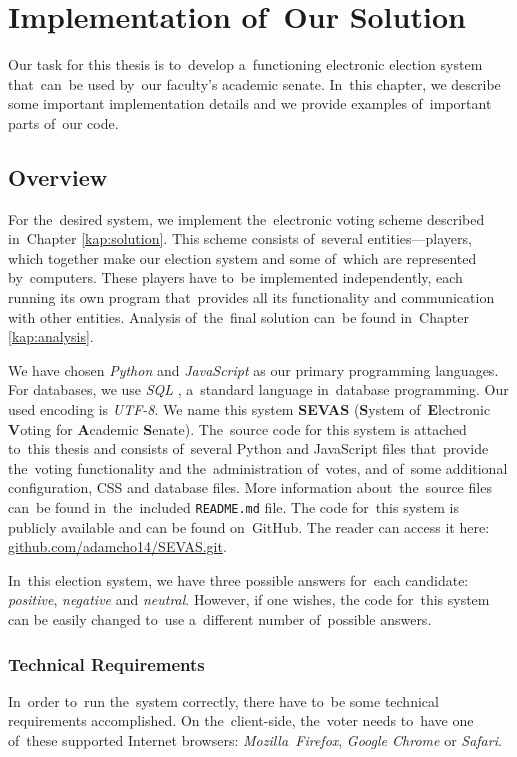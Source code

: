 \chapter{Implementation of~Our Solution}
\label{kap:implementation}
Our task for this thesis is to~develop a~functioning electronic election system that~can~be used by~our faculty's academic senate. In~this chapter, we describe some important implementation details and we provide examples of~important parts of~our code.

\section{Overview}
For the~desired system, we implement the~electronic voting scheme described in~Chapter \ref{kap:solution}. This scheme consists of~several entities—players, which together make our election system and some of~which are represented by~computers. These players have to~be implemented independently, each running its own program that~provides all its functionality and communication with other entities. Analysis of~the~final solution can~be found in~Chapter \ref{kap:analysis}.

We have chosen \emph{Python} \cite{Python} and \emph{JavaScript} \cite{JavaScript} as our primary programming languages. For databases, we use \emph{SQL} \cite{SQL}, a~standard language in~database programming. Our used encoding is \emph{UTF-8}.
\bigbreak
We name this system \textbf{SEVAS} (\textbf System of~\textbf Electronic \textbf Voting for \textbf Academic \textbf Senate). The~source code for this system is attached to~this thesis and consists of~several Python and JavaScript files that~provide the~voting functionality and the~administration of~votes, and of~some additional configuration, CSS and database files. More information about~the~source files can~be found in~the~included \texttt{README.md} file. The code for~this system is publicly available and can be found on~GitHub. The reader can access it here: \url{github.com/adamcho14/SEVAS.git}.

In~this election system, we have three possible answers for~each candidate: \emph{positive}, \emph{negative} and \emph{neutral}. However, if one wishes, the code for~this system can be easily changed to~use a~different number of~possible answers.

\subsection{Technical Requirements}
In~order to~run the~system correctly, there have to~be some technical requirements accomplished. On the~client-side, the~voter needs to~have one of~these supported Internet browsers: \emph{Mozilla~Firefox}, \emph{Google Chrome} or \emph{Safari}.

